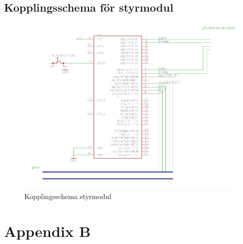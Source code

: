 \documentclass[a4paper,12pt,fleqn]{article}
\begin{document}
\subsection{Kopplingsschema för styrmodul}

\begin{figure}[htp] %
  \begin{center}
  \includegraphics[keepaspectratio=true,scale=0.4]{kopplingsschema_styrmodul.png}  %
  \end{center}
  \caption{Kopplingsschema styrmodul} %
  \label{fig:styr} %
\end{figure}


\thispagestyle{empty}

\newpage
\section{Appendix B}
\thispagestyle{empty}
\end{document}

